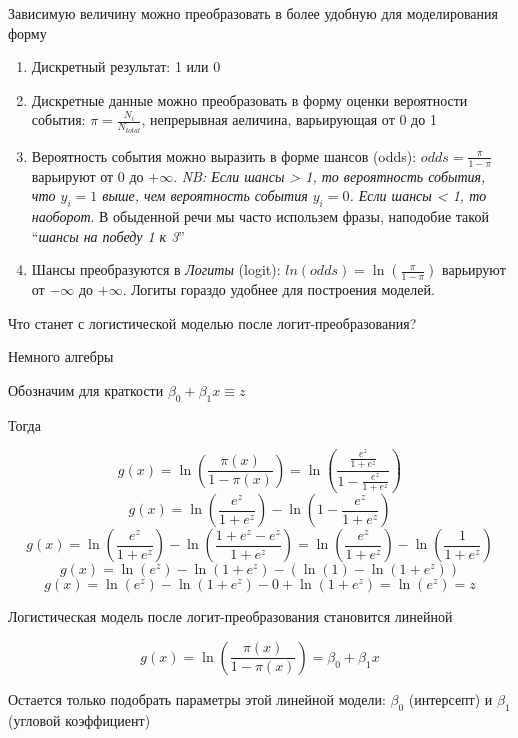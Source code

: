 \documentclass[ignorenonframetext,]{beamer}
\providecommand{\tightlist}{%
\setlength{\itemsep}{0pt}\setlength{\parskip}{0pt}}
\begin{document}
\begin{frame}{Зависимую величину можно преобразовать в более удобную для
моделирования форму}

\begin{enumerate}[<+->]
\def\labelenumi{\arabic{enumi}.}
\tightlist
\item
  Дискретный результат: 1 или 0
\item
  Дискретные данные можно преобразовать в форму оценки вероятности
  события: \(\pi = \frac{N_i}{N_{total}}\), непрерывная аеличина,
  варьирующая от 0 до 1
\item
  Вероятность события можно выразить в форме шансов (odds):
  \(odds=\frac{\pi}{1-\pi}\) варьируют от 0 до \(+\infty\). \emph{NB:
  Если шансы \textgreater{} 1, то вероятность события, что \(y_i=1\)
  выше, чем вероятность события \(y_i = 0\). Если шансы \textless{} 1,
  то наоборот}. В обыденной речи мы часто использем фразы, наподобие
  такой ``\emph{шансы на победу 1 к 3}''
\item
  Шансы преобразуются в \emph{Логиты} (logit):
  \(ln(odds)=\ln(\frac{\pi}{1-\pi})\) варьируют от \(-\infty\) до
  \(+\infty\). Логиты гораздо удобнее для построения моделей.
\end{enumerate}

\end{frame}

\begin{frame}{Что станет с логистической моделью после
логит-преобразования?}

\begin{block}{Немного алгебры}

Обозначим для краткости \(\beta_0 + \beta_1x \equiv z\)

Тогда

\begin{small}
$$ g(x)=\ln(\frac{\pi(x)}{1-\pi(x)})= \ln(\frac{\frac{e^z}{1+e^z}}{1-\frac{e^z}{1+e^z}}) $$
\pause
$$ g(x)=\ln(\frac{e^z}{1+e^z}) - \ln({1-\frac{e^z}{1+e^z}}) $$
\pause
$$ g(x)=\ln(\frac{e^z}{1+e^z}) - \ln({\frac{1+e^z - e^z}{1+e^z}}) = \ln(\frac{e^z}{1+e^z}) - \ln({\frac{1}{1+e^z}})  $$
\pause
$$ g(x)=\ln(e^z) - \ln(1+e^z) - (\ln(1) -\ln(1+e^z))  $$
\pause
$$ g(x)=\ln(e^z) - \ln(1+e^z) - 0 +\ln(1+e^z) = \ln(e^z) = z $$
\end{small}

\end{block}

\end{frame}

\begin{frame}{Логистическая модель после логит-преобразования становится
линейной}

\[ g(x)=\ln(\frac{\pi(x)}{1-\pi(x)})=\beta_0 + \beta_1x\]

Остается только подобрать параметры этой линейной модели: \(\beta_0\)
(интерсепт) и \(\beta_1\) (угловой коэффициент)

\end{frame}
\end{document}
